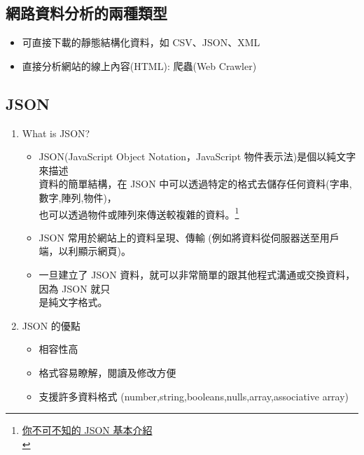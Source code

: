 \documentclass[a4paper,12pt]{article}
\begin{document}
\subsection{網路資料分析的兩種類型}
\label{sec:orgaa94099}
\begin{itemize}
\item 可直接下載的靜態結構化資料，如 CSV、JSON、XML\\
\item 直接分析網站的線上內容(HTML): 爬蟲(Web Crawler)\\
\end{itemize}

\subsection{JSON}
\label{sec:orgef8efff}
\begin{enumerate}
\item What is JSON?
\label{sec:org7cb6ff7}
\begin{itemize}
\item JSON(JavaScript Object Notation，JavaScript 物件表示法)是個以純文字來描述\\
資料的簡單結構，在 JSON 中可以透過特定的格式去儲存任何資料(字串,數字,陣列,物件)，\\
也可以透過物件或陣列來傳送較複雜的資料。\footnote{\href{https://blog.wu-boy.com/2011/04/\%E4\%BD\%A0\%E4\%B8\%8D\%E5\%8F\%AF\%E4\%B8\%8D\%E7\%9F\%A5\%E7\%9A\%84-json-\%E5\%9F\%BA\%E6\%9C\%AC\%E4\%BB\%8B\%E7\%B4\%B9/}{你不可不知的 JSON 基本介紹}\\}\\
\item JSON 常用於網站上的資料呈現、傳輸 (例如將資料從伺服器送至用戶端，以利顯示網頁)。\\
\item 一旦建立了 JSON 資料，就可以非常簡單的跟其他程式溝通或交換資料，因為 JSON 就只\\
是純文字格式。\\
\end{itemize}
\item JSON 的優點
\label{sec:org68b7d05}
\begin{itemize}
\item 相容性高\\
\item 格式容易瞭解，閱讀及修改方便\\
\item 支援許多資料格式 (number,string,booleans,nulls,array,associative array)\\

\end{itemize}
\end{enumerate}
\end{document}
